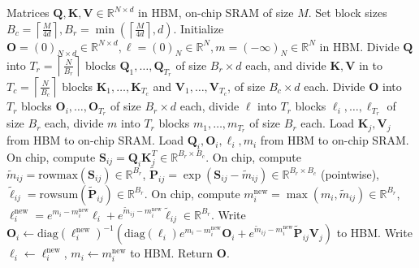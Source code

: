 \begin{algorithm}[H]

  \caption{\small\label{alg:stream_attn}\textsc{FlashAttention}}
  \begin{algorithmic}[1]
    \REQUIRE Matrices $\mathbf{Q}, \mathbf{K}, \mathbf{V} \in \mathbb{R}^{N \times d}$ in HBM, on-chip SRAM of size $M$.
    \STATE Set block sizes $B_c = \left\lceil \frac{M}{4d} \right\rceil, B_r = \min \left( \left\lceil \frac{M}{4d} \right\rceil , d \right)$.
    \STATE \label{alg:stream_attn_init} Initialize $\mathbf{O} = (0)_{N \times d} \in \mathbb{R}^{N \times d}, \ell = (0)_N \in \mathbb{R}^{N}, m = (-\infty)_N \in \mathbb{R}^{N}$ in HBM.
    \STATE \label{alg:stream_attn_split_qkv} Divide $\mathbf{Q}$ into $T_r = \left\lceil\frac{N}{B_r} \right\rceil$ blocks $\mathbf{Q}_1, \dots, \mathbf{Q}_{T_r}$ of size $B_r \times d$ each, and divide $\mathbf{K}, \mathbf{V}$ in to $T_c = \left\lceil \frac{N}{B_c} \right\rceil$ blocks $\mathbf{K}_1, \dots, \mathbf{K}_{T_c}$ and
    $\mathbf{V}_1, \dots, \mathbf{V}_{T_c}$, of size $B_c \times d$ each.
    \STATE Divide $\mathbf{O}$ into $T_r$ blocks $\mathbf{O}_i, \dots, \mathbf{O}_{T_r}$ of size $B_r \times d$ each, divide $\ell$ into $T_r$ blocks $\ell_i, \dots, \ell_{T_r}$ of size $B_r$ each, divide $m$ into $T_r$ blocks $m_1, \dots, m_{T_r}$ of size $B_r$ each.
     \label{alg:stream_attn_outer_loop}
      \STATE \label{alg:stream_attn_load_kv} Load $\mathbf{K}_j, \mathbf{V}_j$ from HBM to on-chip SRAM.
        \STATE \label{alg:stream_attn_load_qo} Load $\mathbf{Q}_i, \mathbf{O}_i, \ell_i, m_i$ from HBM to on-chip SRAM.
        \STATE \label{alg:stream_attn_qk} On chip, compute $\mathbf{S}_{ij} = \mathbf{Q}_i \mathbf{K}_j^T \in \mathbb{R}^{B_r \times B_c}$.
        \STATE \label{alg:stream_attn_statistics} On chip, compute $\tilde{m}_{ij} = \mathrm{rowmax}(\mathbf{S}_{ij}) \in \mathbb{R}^{B_r}$, $\tilde{\mathbf{P}}_{ij} = \exp(\mathbf{S}_{ij} - \tilde{m}_{ij}) \in \mathbb{R}^{B_r \times B_c}$ (pointwise),
        $\tilde{\ell}_{ij} = \mathrm{row sum}(\tilde{\mathbf{P}}_{ij}) \in \mathbb{R}^{B_r}$.
        \STATE On chip, compute $m_i^{\mathrm{new}} = \max(m_i, \tilde{m}_{ij}) \in \mathbb{R}^{B_r}$, $\ell_i^{\mathrm{new}} = e^{m_i - m_i^{\mathrm{new}}} \ell_i + e^{\tilde{m}_{ij} - m_i^{\mathrm{new}}} \tilde{\ell}_{ij} \in \mathbb{R}^{B_r}$.
        \STATE \label{alg:stream_attn_aggregate} Write $\mathbf{O}_i \leftarrow \mathrm{diag}(\ell_i^{\mathrm{new}})^{-1}(\mathrm{diag}(\ell_i) e^{m_i - m_i^{\mathrm{new}}} \mathbf{O}_i + e^{\tilde{m}_{ij} - m_i^{\mathrm{new}}}\tilde{\mathbf{P}}_{ij} \mathbf{V}_j)$
        to HBM.
        \STATE Write $\ell_i \leftarrow \ell_i^{\mathrm{new}}$, $m_i \leftarrow m_i^{\mathrm{new}}$ to HBM.
      \ENDFOR
    \ENDFOR \STATE Return $\mathbf{O}$.
  \end{algorithmic}
\end{algorithm}

